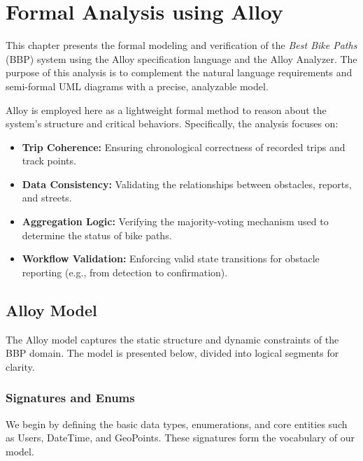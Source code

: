 \chapter{Formal Analysis using Alloy}
\label{chap:Formal-Analysis-using-Alloy}

\par
This chapter presents the formal modeling and verification of the \textit{Best Bike Paths} (BBP) system using the Alloy specification language and the Alloy Analyzer. The purpose of this analysis is to complement the natural language requirements and semi-formal UML diagrams with a precise, analyzable model.

\par
Alloy is employed here as a lightweight formal method to reason about the system's structure and critical behaviors. Specifically, the analysis focuses on:
\begin{itemize}
    \item \textbf{Trip Coherence:} Ensuring chronological correctness of recorded trips and track points.
    \item \textbf{Data Consistency:} Validating the relationships between obstacles, reports, and streets.
    \item \textbf{Aggregation Logic:} Verifying the majority-voting mechanism used to determine the status of bike paths.
    \item \textbf{Workflow Validation:} Enforcing valid state transitions for obstacle reporting (e.g., from detection to confirmation).
\end{itemize}

\section{Alloy Model}
\label{sec:alloy-model}

\par
The Alloy model captures the static structure and dynamic constraints of the BBP domain. The model is presented below, divided into logical segments for clarity.

\subsection{Signatures and Enums}
\par
We begin by defining the basic data types, enumerations, and core entities such as Users, DateTime, and GeoPoints. These signatures form the vocabulary of our model.

